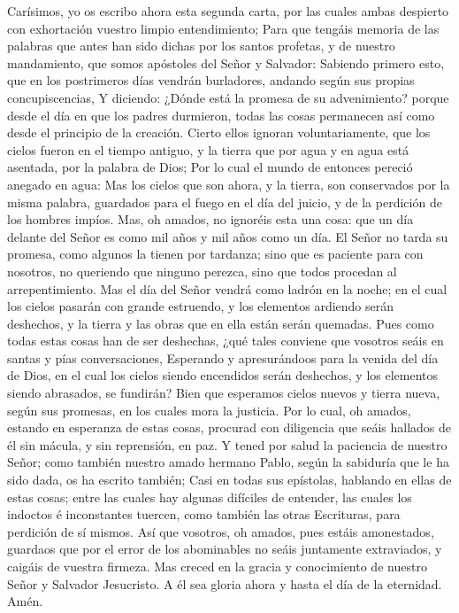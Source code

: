  Carísimos, yo os escribo ahora esta segunda carta, por
las cuales ambas despierto con exhortación vuestro limpio entendimiento;
 Para que tengáis memoria de las palabras que antes han
sido dichas por los santos profetas, y de nuestro mandamiento, que somos
apóstoles del Señor y Salvador:  Sabiendo primero esto,
que en los postrimeros días vendrán burladores, andando según sus
propias concupiscencias,  Y diciendo: ¿Dónde está la
promesa de su advenimiento? porque desde el día en que los padres
durmieron, todas las cosas permanecen así como desde el principio de la
creación.  Cierto ellos ignoran voluntariamente, que los
cielos fueron en el tiempo antiguo, y la tierra que por agua y en agua
está asentada, por la palabra de Dios;  Por lo cual el
mundo de entonces pereció anegado en agua:  Mas los cielos
que son ahora, y la tierra, son conservados por la misma palabra,
guardados para el fuego en el día del juicio, y de la perdición de los
hombres impíos.  Mas, oh amados, no ignoréis esta una
cosa: que un día delante del Señor es como mil años y mil años como un
día.  El Señor no tarda su promesa, como algunos la tienen
por tardanza; sino que es paciente para con nosotros, no queriendo que
ninguno perezca, sino que todos procedan al arrepentimiento.
 Mas el día del Señor vendrá como ladrón en la noche; en
el cual los cielos pasarán con grande estruendo, y los elementos
ardiendo serán deshechos, y la tierra y las obras que en ella están
serán quemadas.  Pues como todas estas cosas han de ser
deshechas, ¿qué tales conviene que vosotros seáis en santas y pías
conversaciones,  Esperando y apresurándoos para la venida
del día de Dios, en el cual los cielos siendo encendidos serán
deshechos, y los elementos siendo abrasados, se fundirán?
 Bien que esperamos cielos nuevos y tierra nueva, según
sus promesas, en los cuales mora la justicia.  Por lo
cual, oh amados, estando en esperanza de estas cosas, procurad con
diligencia que seáis hallados de él sin mácula, y sin reprensión, en
paz.  Y tened por salud la paciencia de nuestro Señor;
como también nuestro amado hermano Pablo, según la sabiduría que le ha
sido dada, os ha escrito también;  Casi en todas sus
epístolas, hablando en ellas de estas cosas; entre las cuales hay
algunas difíciles de entender, las cuales los indoctos é inconstantes
tuercen, como también las otras Escrituras, para perdición de sí mismos.
 Así que vosotros, oh amados, pues estáis amonestados,
guardaos que por el error de los abominables no seáis juntamente
extraviados, y caigáis de vuestra firmeza.  Mas creced en
la gracia y conocimiento de nuestro Señor y Salvador Jesucristo. A él
sea gloria ahora y hasta el día de la eternidad. Amén.
